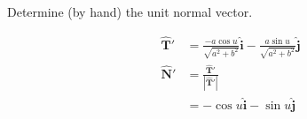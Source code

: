 Determine (by hand) the unit normal vector.

\begin{solution}
\begin{align*}
    \boldsymbol{\hat{T}'} &= \frac{-a\cos u}{\sqrt{a^2+b^2}} \hat{\boldsymbol{i}} - \frac{a\sin u}{\sqrt{a^2+b^2}} \hat{\boldsymbol{j}} \\
    \boldsymbol{\hat{N}'} &= \frac{\boldsymbol{\hat{T}'}}{|\boldsymbol{\hat{T}'}|} \\
    &= -\cos u \hat{\boldsymbol{i}} - \sin u \hat{\boldsymbol{j}} \\
\end{align*}
\end{solution}